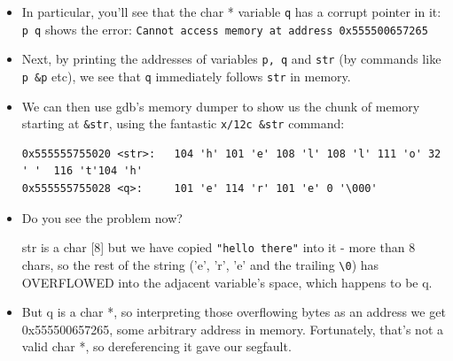 \documentclass[handout]{beamer}
\newcommand{\pitem}{\pause \item}
\begin{document}
\begin{frame}[fragile]
    \begin{itemize}
      \item
      In particular, you'll see that the char * variable \verb+q+ has a corrupt pointer in it:
        \verb'p q' shows the error:
	\verb+Cannot access memory at address 0x555500657265+

      \pitem
      Next, by printing the addresses of variables \verb+p, q+ and \verb+str+
      (by commands like \verb+p &p+ etc), we see that \verb+q+
      \alert{immediately follows} \verb+str+ in memory.

      \pitem
      We can then use gdb's \alert{memory dumper} to show us the chunk of memory
      starting at \verb+&str+, using the fantastic \verb+x/12c &str+ command:

	{\tiny
	\begin{verbatim}
0x555555755020 <str>:   104 'h' 101 'e' 108 'l' 108 'l' 111 'o' 32 ' '  116 't'104 'h'
0x555555755028 <q>:     101 'e' 114 'r' 101 'e' 0 '\000'
	\end{verbatim}
	}

      \item
      Do you see the problem now?

      \pause
      str is a \alert{char [8]} but we have copied \verb+"hello there"+
      into it - more than 8 chars,
      \pause
      so the rest of the string
      ('e', 'r', 'e' and the trailing \verb+\0+)
      has OVERFLOWED into the adjacent variable's space, which happens to be
      \alert{q}.

      \pitem
      But q is a char *, so interpreting those overflowing bytes as an address we get
      0x555500657265, some arbitrary address in memory.
      Fortunately, that's not a valid char *, so dereferencing it gave our segfault.

    \end{itemize}
\end{frame}
\end{document}
